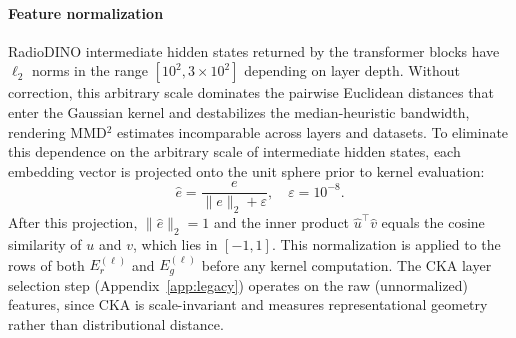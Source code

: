 \documentclass[lettersize,journal]{IEEEtran}
\begin{document}
\paragraph{Feature normalization}
RadioDINO intermediate hidden states returned by the transformer blocks
have $\ell_2$ norms in the range $[10^2, 3 \times 10^2]$ depending on
layer depth.
Without correction, this arbitrary scale dominates the pairwise Euclidean
distances that enter the Gaussian kernel and destabilizes the
median-heuristic bandwidth, rendering MMD$^2$ estimates incomparable
across layers and datasets.
To eliminate this dependence on the arbitrary scale of intermediate
hidden states, each embedding vector is projected onto the unit sphere
prior to kernel evaluation:
\begin{equation}
  \label{eq:l2norm}
  \hat{e} = \frac{e}{\lVert e \rVert_2 + \varepsilon},
  \quad \varepsilon = 10^{-8}.
\end{equation}
After this projection, $\lVert \hat{e} \rVert_2 = 1$ and the inner
product $\hat{u}^\top \hat{v}$ equals the cosine similarity of $u$ and
$v$, which lies in $[-1, 1]$.
This normalization is applied to the rows of both $E_r^{(\ell)}$ and
$E_g^{(\ell)}$ before any kernel computation.
The CKA layer selection step (Appendix~\ref{app:legacy}) operates on
the raw (unnormalized) features, since CKA is scale-invariant and
measures representational geometry rather than distributional distance.
\end{document}
